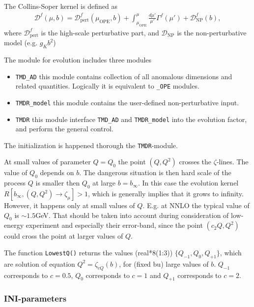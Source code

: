 \documentclass[prd,nofootinbib,eqsecnum,final]{revtex4}
\renewcommand{\(}{\left(}
\renewcommand{\)}{\right)}
\renewcommand{\[}{\left[}
\renewcommand{\]}{\right]}
\begin{document}
The Collins-Soper kernel is defined as
\begin{eqnarray}
\mathcal{D}^f(\mu,b)=\mathcal{D}^f_{\text{pert}}(\mu_{\text{OPE}},b)+\int_{\mu_{\text{OPE}}}^{\mu} \frac{d\mu'}{\mu'}\Gamma^f(\mu')+\mathcal{D}^f_{\text{NP}}(b),
\end{eqnarray}
where $\mathcal{D}^f_{\text{pert}}$ is the high-scale perturbative part, and $\mathcal{D}_{\text{NP}}$ is the non-perturbative model (e.g. $g_Kb^2$)

The module for evolution includes three modules
\begin{itemize}
\item \texttt{TMD\_AD} this module contains collection of all anomalous dimensions and related quantities. Logically it is equivalent to \texttt{\_OPE} modules.
\item \texttt{TMDR\_model} this module contains the user-defined non-perturbative input.
\item \texttt{TMDR} this module interface \texttt{TMD\_AD} and \texttt{TMDR\_model} into the evolution factor, and perform the general control.
\end{itemize}
The initialization is happened thorough the \texttt{TMDR}-module.

At small values of parameter $Q=Q_0$ the point $(Q,Q^2)$ crosses the $\zeta$-lines. The value of $Q_0$ depends on $b$. The dangerous situation is then hard scale of the process $Q$ is smaller then $Q_0$ at large $b=b_\infty$. In this case the evolution kernel $R[b_\infty,(Q,Q^2)\to \zeta_\mu]>1$, which is generally implies that it grows to infinity. However, it happens only at small values of $Q$. E.g. at NNLO the typical value of $Q_0$ is $\sim 1.5$GeV. That should be taken into account during consideration of low-energy experiment and especially their error-band, since the point $(c_2Q,Q^2)$ could cross the point at larger values of $Q$.

The function \texttt{LowestQ()} returns the values (real*8(1:3)) $\{Q_{-1},Q_0,Q_{+1}\}$, which are solution of equation $Q^2=\zeta_{c Q}(b)$, for (fixed bu) large values of $b$. $Q_{-1}$ corresponds to $c=0.5$, $Q_0$ corresponds to $c=1$ and $Q_{+1}$ corresponds to $c=2$.

\subsubsection{INI-parameters}
\end{document}

